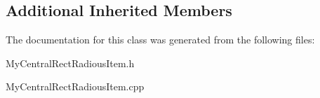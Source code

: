 \subsection*{Additional Inherited Members}


The documentation for this class was generated from the following files\+:\begin{DoxyCompactItemize}
\item 
My\+Central\+Rect\+Radious\+Item.\+h\item 
My\+Central\+Rect\+Radious\+Item.\+cpp\end{DoxyCompactItemize}
